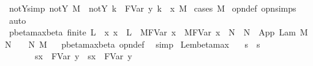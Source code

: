 \begin{isabellebody}
\isanewline
{}\isamarkupfalse%
\ not{\isacharunderscore}Y{\isacharunderscore}simp{\isacharcolon}\ {\isachardoublequoteopen}not{\isacharunderscore}Y\ M\ {\isasymLongrightarrow}\ not{\isacharunderscore}Y\ {\isacharbraceleft}k\ {\isasymrightarrow}\ FVar\ y{\isacharbraceright}\ {\isacharbraceleft}k\ {\isacharless}{\isacharminus}\ x{\isacharbraceright}\ M{\isachardoublequoteclose}\isanewline
%
\isadelimproof
%
\endisadelimproof
%
\isatagproof
{}\isamarkupfalse%
\ {\isacharparenleft}cases\ M{\isacharparenright}\isanewline
{}\isamarkupfalse%
\ opn{\isacharprime}{\isacharunderscore}def\ opn{\isachardot}simps\isanewline
{}\isamarkupfalse%
\ auto%
\endisatagproof
{\isafoldproof}%
%
\isadelimproof
%
\endisadelimproof
%
\isamarkuptrue%
\isamarkupfalse%
\ pbeta{\isacharunderscore}max{\isacharunderscore}beta{\isacharprime}{\isacharcolon}\ {\isachardoublequoteopen}finite\ L\ {\isasymLongrightarrow}\ {\isacharparenleft}{\isasymAnd}x{\isachardot}\ x\ {\isasymnotin}\ L\ {\isasymLongrightarrow}\ M{\isacharcircum}{\isacharparenleft}FVar\ x{\isacharparenright}\ {\isachargreater}{\isachargreater}{\isachargreater}\ M{\isacharprime}{\isacharcircum}{\isacharparenleft}FVar\ x{\isacharparenright}{\isacharparenright}\ {\isasymLongrightarrow}\ N\ {\isachargreater}{\isachargreater}{\isachargreater}\ N{\isacharprime}\ {\isasymLongrightarrow}\ App\ {\isacharparenleft}Lam\ M{\isacharparenright}\ N\ {\isachargreater}{\isachargreater}{\isachargreater}\ {\isacharbraceleft}{}\ {\isasymrightarrow}\ N{\isacharprime}{\isacharbraceright}\ M{\isacharprime}{\isachardoublequoteclose}%
\isadelimproof
\ %
\endisadelimproof
%
\isatagproof
{}\isamarkupfalse%
\ pbeta{\isacharunderscore}max{\isachardot}beta\ opn{\isacharprime}{\isacharunderscore}def\ \isamarkupfalse%
\ simp%
\endisatagproof
{\isafoldproof}%
%
\isadelimproof
%
\endisadelimproof
\isanewline
\isanewline
{}\isamarkupfalse%
\ Lem{}{\isacharunderscore}{}{\isacharunderscore}{}{\isacharunderscore}beta{\isacharunderscore}max{\isacharcolon}\isanewline
\ \ \ {\isachardoublequoteopen}s\ {\isachargreater}{\isachargreater}{\isachargreater}\ s{\isacharprime}{\isachardoublequoteclose}\isanewline
\ \ \ \ \ \ \ {\isachardoublequoteopen}{\isacharparenleft}s{\isacharbrackleft}x\ {\isacharcolon}{\isacharcolon}{\isacharequal}\ FVar\ y{\isacharbrackright}{\isacharparenright}\ {\isachargreater}{\isachargreater}{\isachargreater}\ {\isacharparenleft}s{\isacharprime}{\isacharbrackleft}x\ {\isacharcolon}{\isacharcolon}{\isacharequal}\ FVar\ y{\isacharbrackright}{\isacharparenright}{\isachardoublequoteclose}\isanewline

\end{isabellebody}
